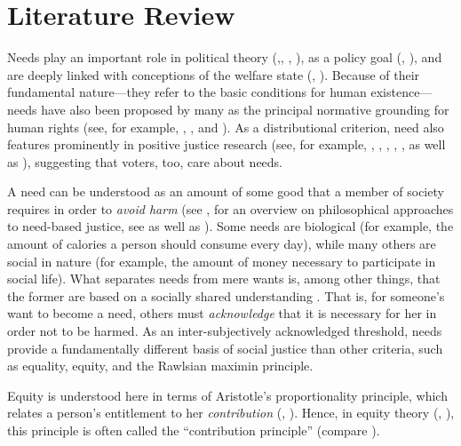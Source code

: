 \documentclass[smallcondensed]{svjour3}
\begin{document}
\section{Literature Review}\label{sec:literature}
%
Needs play an important role in political theory (\citealt{doyal_theory_1984},\citealt{weale_political_1984}, \citealt{nussbaum_human_1992}, \citealt{dean_translation_2013}), as a policy goal (\citealt{esping-andersen_three_1990}, \citealt{boarini_measures_2006}), and are deeply linked with conceptions of the welfare state (\citealt{dean_welfare_2002}, \citealt{plant_political_2009}). Because of their fundamental nature---they refer to the basic conditions for human existence---needs have also been proposed by many as the principal normative grounding for human rights (see, for example, \citealt{brock_needs_2005}, \citealt{gasper_needs_2005}, and \citealt{renzo_human_2015}). As a distributional criterion, need also features prominently in positive justice research (see, for example, \citealt{frohlich_choosing_1990}, \citealt{scott_just_2001}, \citealt{konow_which_2003}, \citealt{michelbach_doing_2003}, \citealt{scott_whats_2009}, as well as \citealt{sabbagh_sociology_2016}), suggesting that voters, too, care about needs.\par
%
A need can be understood as an amount of some good that a member of society requires in order to \textit{avoid harm} (see \citealt{miller_principles_1999}, for an overview on philosophical approaches to need-based justice, see \citealt{siebel_need-based_2020} as well as \citealt{miller_needs-based_2020}). Some needs are biological (for example, the amount of calories a person should consume every day), while many others are social in nature (for example, the amount of money necessary to participate in social life). What separates needs from mere wants is, among other things, that the former are based on a socially shared understanding \citep{miller_principles_1999}. That is, for someone's want to become a need, others must \textit{acknowledge} that it is necessary for her in order not to be harmed. As an inter-subjectively acknowledged threshold, needs provide a fundamentally different basis of social justice than other criteria, such as equality, equity, and the Rawlsian maximin principle.\par
%
Equity is understood here in terms of Aristotle's proportionality principle, which relates a person's entitlement to her \textit{contribution} (\citealt{aristotle_nicomachean_2009}, \citealt{young_equity_1994}). Hence, in equity theory (\citealt{homans_social_1958}, \citealt{adams_inequity_1965}), this principle is often called the ``contribution principle'' (compare \citealt{diederich_identifying_2020}).\par
\end{document}
